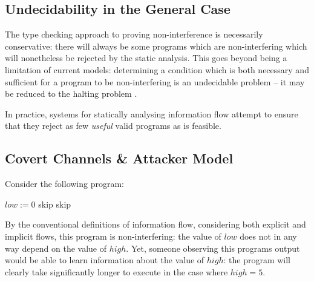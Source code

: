 \subsection{Undecidability in the General Case}

The type checking approach to proving non-interference is necessarily conservative: there will always be some programs which are non-interfering which will nonetheless be rejected by the static analysis. This goes beyond being a limitation of current models: determining a condition which is both necessary and sufficient for a program to be non-interfering is an undecidable problem \cite{denning1977certification} \cite{landi1992undecidability} -- it may be reduced to the halting problem \cite{sabelfeld2003if}.

%


In practice, systems for statically analysing information flow attempt to ensure that they reject as few \textit{useful} valid programs as is feasible.

\subsection{Covert Channels \& Attacker Model}

Consider the following program:

\begin{algorithmic}
	\State $ low := 0 $
			\State skip
		\EndFor
	\Else
		\State skip
	\EndIf
\end{algorithmic}

By the conventional definitions of information flow, considering both explicit and implicit flows, this program is non-interfering: the value of $ low $ does not in any way depend on the value of $ high $. Yet, someone observing this programs output would be able to learn information about the value of $ high $: the program will clearly take significantly longer to execute in the case where $ high = 5 $.

